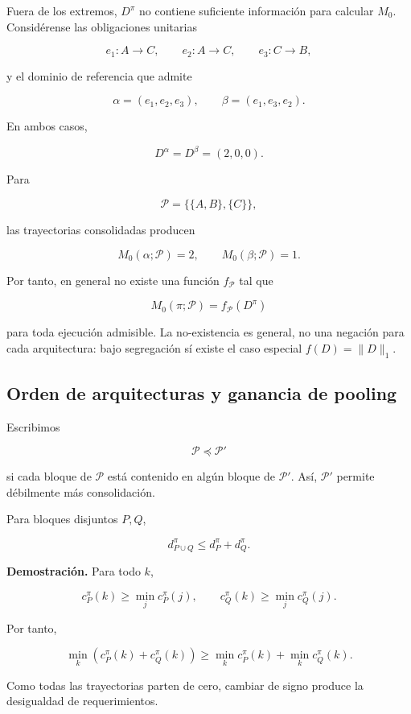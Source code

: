 \documentclass[10pt,a5paper,twoside]{article}
\begin{document}
Fuera de los extremos, \(D^\pi\) no contiene suficiente información para
calcular \(M_0\). Considérense las obligaciones unitarias

\[
e_1:A\to C,\qquad
e_2:A\to C,\qquad
e_3:C\to B,
\]

y el dominio de referencia que admite

\[
\alpha=(e_1,e_2,e_3),
\qquad
\beta=(e_1,e_3,e_2).
\]

En ambos casos,

\[
D^\alpha=D^\beta=(2,0,0).
\]

Para

\[
\mathcal P=\{\{A,B\},\{C\}\},
\]

las trayectorias consolidadas producen

\[
M_0(\alpha;\mathcal P)=2,
\qquad
M_0(\beta;\mathcal P)=1.
\]

Por tanto, en general no existe una función \(f_{\mathcal P}\) tal que

\[
M_0(\pi;\mathcal P)
=
f_{\mathcal P}(D^\pi)
\]

para toda ejecución admisible. La no-existencia es general, no una
negación para cada arquitectura: bajo segregación sí existe el caso especial
\(f(D)=\|D\|_1\).

\subsection{Orden de arquitecturas y ganancia de pooling}\label{orden-de-arquitecturas-y-ganancia-de-pooling}

Escribimos

\[
\mathcal P\preceq\mathcal P'
\]

si cada bloque de \(\mathcal P\) está contenido en algún bloque de
\(\mathcal P'\). Así, \(\mathcal P'\) permite débilmente más
consolidación.

Para bloques disjuntos \(P,Q\),

\[
d^\pi_{P\cup Q}
\le
d^\pi_P+d^\pi_Q.
\]

\textbf{Demostración.} Para todo \(k\),

\[
c^\pi_P(k)\ge\min_jc^\pi_P(j),
\qquad
c^\pi_Q(k)\ge\min_jc^\pi_Q(j).
\]

Por tanto,

\[
\min_k(c^\pi_P(k)+c^\pi_Q(k))
\ge
\min_kc^\pi_P(k)+\min_kc^\pi_Q(k).
\]

Como todas las trayectorias parten de cero, cambiar de signo produce la
desigualdad de requerimientos.
\end{document}
